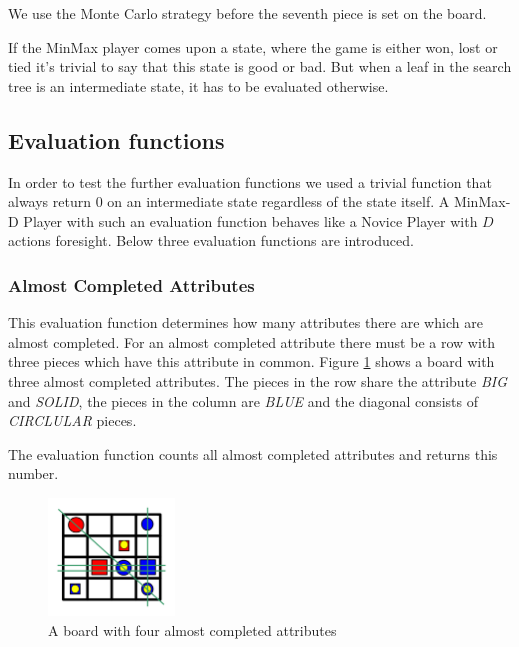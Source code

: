 We use the Monte Carlo strategy before the seventh piece is set on the board.

If the MinMax player comes upon a state, where the game is either won, lost or tied it's trivial to say that this state is good or bad. But when a leaf in the search tree is an intermediate state, it has to be evaluated otherwise.
\subsection{Evaluation functions}
In order to test the further evaluation functions we used a trivial function that always return 0 on an intermediate state regardless of the state itself. A MinMax-D Player with such an evaluation function behaves like a Novice Player with $D$ actions foresight. Below three evaluation functions are introduced.
\subsubsection*{Almost Completed Attributes}
This evaluation function determines how many attributes there are which are almost completed. For an almost completed attribute there must be a row with three pieces which have this attribute in common. Figure \ref{fig:almostCompletedRows} shows a board with three almost completed attributes. The pieces in the row share the attribute \emph{BIG} and \emph{SOLID}, the pieces in the column are \emph{BLUE} and the diagonal consists of \emph{CIRCLULAR} pieces.

The evaluation function counts all almost completed attributes and returns this number.
\begin{figure}[h]
  \centering
  \includegraphics[width=0.3\textwidth]{images/almostCompletedRows}
  \caption{A board with four almost completed attributes}
  \label{fig:almostCompletedRows}
\end{figure}
